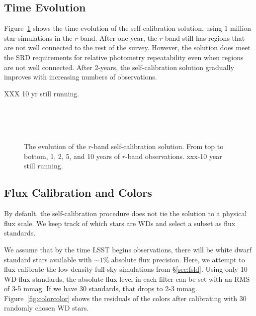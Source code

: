 \documentclass[12pt,preprint]{aastex}
\begin{document}
\subsection{Time Evolution}

Figure~\ref{fig:timeevo} shows the time evolution of the self-calibration solution, using 1 million star simulations in the $r$-band.  After one-year, the $r$-band still has regions that are not well connected to the rest of the survey.  However, the solution does meet the SRD requirements for relative photometry repeatability even when regions are not well connected.  After 2-years, the self-calibration solution gradually improves with increasing numbers of observations.  

XXX 10 yr still running.



\begin{figure}
 \\
 \\
 \\
\caption{The evolution of the $r$-band self-calibration solution.  From top to bottom, 1, 2, 5, and 10 years of $r$-band observations.  xxx-10 year still running.  \label{fig:timeevo}}
\end{figure}



\subsection{Flux Calibration and Colors}\label{sec:fluxcal}

By default, the self-calibration procedure does not tie the solution to a physical flux scale.  We keep track of which stars are WDs and select a subset as flux standards.  


We assume that by the time LSST begins observations, there will be white dwarf standard stars available with $\sim1\%$ absolute flux precision.  Here, we attempt to flux calibrate the low-density full-sky simulations from \S\ref{sec:fsld}.  Using only 10 WD flux standards, the absolute flux level in each filter can be set with an RMS of 3-5 mmag.  If we have 30 standards, that drops to 2-3 mmag.  Figure~\ref{fig:colorcolor} shows the residuals of the colors after calibrating with 30 randomly chosen WD stars.  
\end{document}
